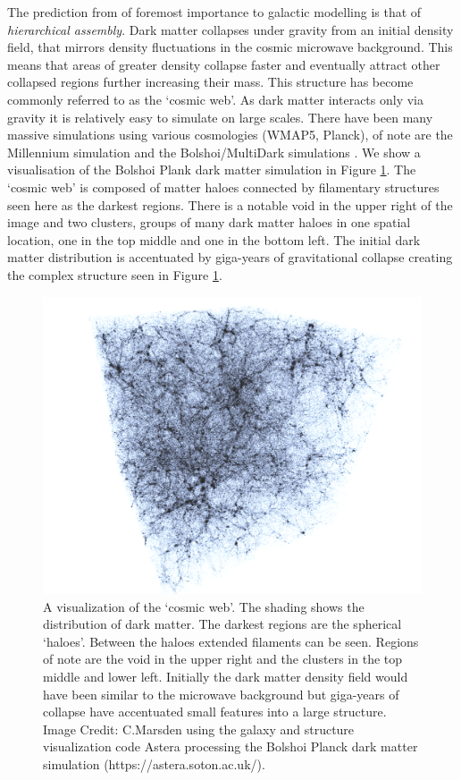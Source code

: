 The prediction from \LCDM of foremost importance to galactic modelling is that of \textit{hierarchical assembly}. Dark matter collapses under gravity from an initial density field, that mirrors density fluctuations in the cosmic microwave background. This means that areas of greater density collapse faster and eventually attract other collapsed regions further increasing their mass. This structure has become commonly referred to as the `cosmic web'. As dark matter interacts only via gravity it is relatively easy to simulate on large scales. There have been many massive \LCDM simulations using various cosmologies (WMAP5, Planck), of note are the Millennium simulation \citep{Boylan-Kolchin2009ResolvingSimulation} and the Bolshoi/MultiDark simulations \citep{Klypin2016}. We show a visualisation of the Bolshoi Plank dark matter simulation in Figure \ref{fig:DMStruct}. The `cosmic web' is composed of matter haloes connected by filamentary structures seen here as the darkest regions. There is a notable void in the upper right of the image and two clusters, groups of many dark matter haloes in one spatial location, one in the top middle and one in the bottom left. The initial dark matter distribution is accentuated by giga-years of gravitational collapse creating the complex structure seen in Figure \ref{fig:DMStruct}.

\begin{figure}[ht]
    \centering
    \includegraphics[width = \linewidth]{Figures/Chapter1/DMStruct.png}
    \caption{A visualization of the `cosmic web'. The shading shows the distribution of dark matter. The darkest regions are the spherical `haloes'. Between the haloes extended filaments can be seen. Regions of note are the void in the upper right and the clusters in the top middle and lower left. Initially the dark matter density field would have been similar to the microwave background but giga-years of collapse have accentuated small features into a large structure. Image Credit: C.Marsden using the galaxy and structure visualization code Astera processing the Bolshoi Planck dark matter simulation (https://astera.soton.ac.uk/).}
    \label{fig:DMStruct}
\end{figure}


